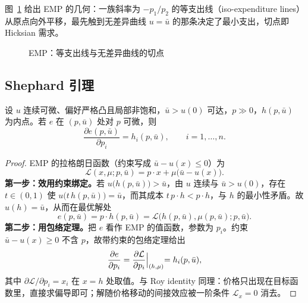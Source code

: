 图~\ref{fig:emp-tangency} 给出 EMP 的几何：一族斜率为 $-p_1/p_2$ 的等支出线（iso-expenditure lines）从原点向外平移，最先触到无差异曲线 $u=\bar u$ 的那条决定了最小支出，切点即 Hicksian 需求。

\begin{figure}[H]
\centering
{}
\caption{EMP：等支出线与无差异曲线的切点}
\label{fig:emp-tangency}
\end{figure}

\subsection{Shephard 引理}

\begin{theorem}[Shephard 引理]\label{thm:shephard}
设 $u$ 连续可微、偏好严格凸且局部非饱和，$\bar u>u(0)$ 可达，$p\gg0$，$h(p,\bar u)$ 为内点。若 $e$ 在 $(p,\bar u)$ 处对 $p$ 可微，则
\[
 \boxed{\;\frac{\partial e(p,\bar u)}{\partial p_i}=h_i(p,\bar u),\qquad i=1,\ldots,n.\;}
\]
\end{theorem}

\begin{proof}
EMP 的拉格朗日函数（约束写成 $\bar u-u(x)\le0$）为
\[
 \mathcal L(x,\mu;p,\bar u)=p\cdot x+\mu\bigl(\bar u-u(x)\bigr).
\]
\textbf{第一步：效用约束绑定。}若 $u\bigl(h(p,\bar u)\bigr)>\bar u$，由 $u$ 连续与 $\bar u>u(0)$，存在 $t\in(0,1)$ 使 $u\bigl(t\,h(p,\bar u)\bigr)=\bar u$，而其成本 $t\,p\cdot h<p\cdot h$，与 $h$ 的最小性矛盾。故 $u(h)=\bar u$，从而在最优解处
\[
 e(p,\bar u)=p\cdot h(p,\bar u)=\mathcal L\bigl(h(p,\bar u),\mu(p,\bar u);p,\bar u\bigr).
\]
\textbf{第二步：用包络定理。}把 $e$ 看作 EMP 的值函数，参数为 $p_i$。约束 $\bar u-u(x)\ge0$ 不含 $p$，故带约束的包络定理给出
\[
 \frac{\partial e}{\partial p_i}
 =\frac{\partial\mathcal L}{\partial p_i}\Bigl|_{(h,\mu)}
 =h_i(p,\bar u),
\]
其中 $\partial\mathcal L/\partial p_i=x_i$ 在 $x=h$ 处取值。与 Roy identity 同理：价格只出现在目标函数里，直接求偏导即可；解随价格移动的间接效应被一阶条件 $\mathcal L_x=0$ 消去。
\end{proof}

